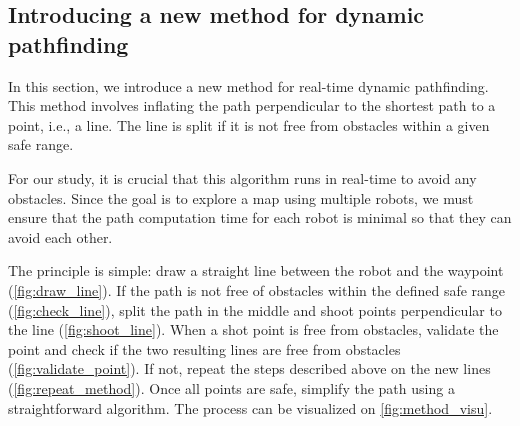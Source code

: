 \documentclass[../main.tex]{subfiles}
\begin{document}
\subsection{Introducing a new method for dynamic pathfinding}

In this section, we introduce a new method for real-time dynamic pathfinding. This method involves inflating the path perpendicular to the shortest path to a point, i.e., a line. The line is split if it is not free from obstacles within a given safe range.
\vspace{1em}

For our study, it is crucial that this algorithm runs in real-time to avoid any obstacles. Since the goal is to explore a map using multiple robots, we must ensure that the path computation time for each robot is minimal so that they can avoid each other.  
\vspace{1em}

The principle is simple: draw a straight line between the robot and the waypoint (\autoref{fig:draw_line}). If the path is not free of obstacles within the defined safe range (\autoref{fig:check_line}), split the path in the middle and shoot points perpendicular to the line (\autoref{fig:shoot_line}). When a shot point is free from obstacles, validate the point and check if the two resulting lines are free from obstacles (\autoref{fig:validate_point}). If not, repeat the steps described above on the new lines (\autoref{fig:repeat_method}). Once all points are safe, simplify the path using a straightforward algorithm. The process can be visualized on \autoref{fig:method_visu}.
\end{document}
